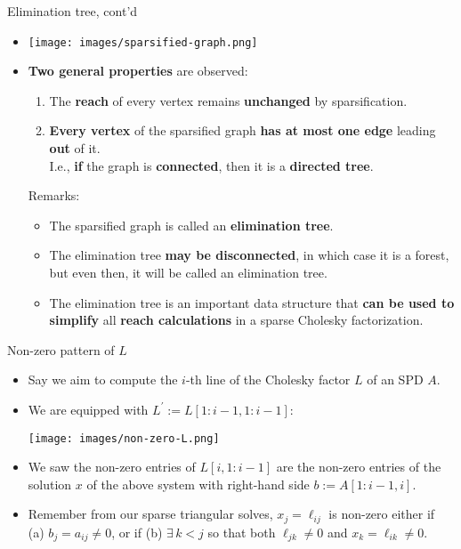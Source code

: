 \documentclass[t,usepdftitle=false]{beamer}
\begin{document}
\begin{frame}{Elimination tree, cont'd}
\begin{itemize}
\item[]
\begin{center}
\texttt{[image: images/sparsified-graph.png]}
\end{center}
\item[] \textbf{Two general properties} are observed:
\begin{enumerate}
\item The \textbf{reach} of every vertex remains \textbf{unchanged} by sparsification.\vspace{.1cm}
\item \textbf{Every vertex} of the sparsified graph \textbf{has at most one edge} leading \textbf{out} of it.\vspace{.1cm}\\
I.e., \textbf{if} the graph is \textbf{connected}, then it is a \textbf{directed tree}.\vspace{.1cm}\\
\end{enumerate}
Remarks:
\begin{itemize}
\item The sparsified graph is called an \textbf{elimination tree}.\vspace{.1cm}
\item The elimination tree \textbf{may be disconnected}, in which case it is a forest, but even then, it will be called an elimination tree.
\item The elimination tree is an important data structure that \textbf{can be used to simplify} all \textbf{reach calculations} in a sparse Cholesky factorization.
\end{itemize}
\end{itemize}
\end{frame}

\begin{frame}{Non-zero pattern of $L$}
\begin{itemize}
\item Say we aim to compute the $i$-th line of the Cholesky factor $L$ of an SPD $A$.
\item We are equipped with $L^\prime:=L[1:i-1,1:i-1]$:
\begin{center}
\texttt{[image: images/non-zero-L.png]}
\end{center}
\item We saw the non-zero entries of $L[i,1:i-1]$ are the non-zero entries of the solution $x$ of the above system with right-hand side $b:=A[1:i-1,i]$.
\item Remember from our sparse triangular solves, $x_j=\ell_{ij}$ is non-zero either if\\ 
(a) $b_j=a_{ij}\neq 0$,
or if (b) $\exists\, k<j$ so that both $\ell_{jk}\neq 0$ and $x_k=\ell_{ik}\neq 0$.
\end{itemize}
\end{frame}
\end{document}
